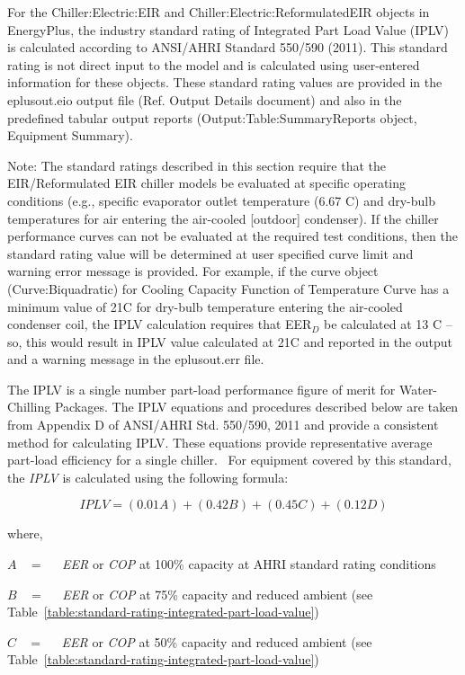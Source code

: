For the Chiller:Electric:EIR and Chiller:Electric:ReformulatedEIR objects in EnergyPlus, the industry standard rating of Integrated Part Load Value (IPLV) is calculated according to ANSI/AHRI Standard 550/590 (2011). This standard rating is not direct input to the model and is calculated using user-entered information for these objects. These standard rating values are provided in the eplusout.eio output file (Ref. Output Details document) and also in the predefined tabular output reports (Output:Table:SummaryReports object, Equipment Summary).

Note: The standard ratings described in this section require that the EIR/Reformulated EIR chiller models be evaluated at specific operating conditions (e.g., specific evaporator outlet temperature (6.67 C) and dry-bulb temperatures for air entering the air-cooled {[}outdoor{]} condenser). If the chiller~ performance curves can not be evaluated at the required test conditions, then the standard rating value will be determined at user specified curve limit and warning error message is provided. For example, if the curve object (Curve:Biquadratic) for Cooling Capacity Function of Temperature Curve has a minimum value of 21C for dry-bulb temperature entering the air-cooled condenser coil, the IPLV calculation requires that EER\(_{D}\) be calculated at 13 C -- so, this would result in IPLV value calculated at 21C and reported in the output and a warning message in the eplusout.err file.

The IPLV is a single number part-load performance figure of merit for Water-Chilling Packages. The IPLV equations and procedures described below are taken from Appendix D of ANSI/AHRI Std. 550/590, 2011 and provide a consistent method for calculating IPLV. These equations provide representative average part-load efficiency for a single chiller. ~For equipment covered by this standard, the \emph{IPLV} is calculated using the following formula:

\begin{equation}
IPLV = (0.01A) + (0.42B) + (0.45C) + (0.12D)
\end{equation}

where,

\(A\) ~ = ~~ \emph{EER} or \emph{COP} at 100\% capacity at AHRI standard rating conditions

\(B\) ~ = ~~ \emph{EER} or \emph{COP} at 75\% capacity and reduced ambient (see Table~\ref{table:standard-rating-integrated-part-load-value})

\(C\) ~ = ~~ \emph{EER} or \emph{COP} at 50\% capacity and reduced ambient (see Table~\ref{table:standard-rating-integrated-part-load-value})

